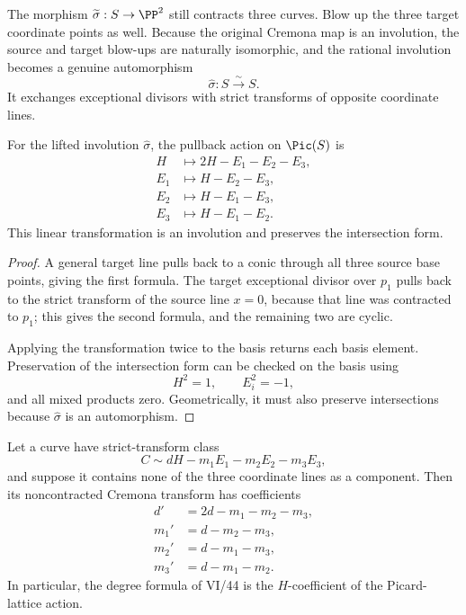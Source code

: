 The morphism \(\widetilde\sigma:S\to\PP^2\) still contracts three curves.  Blow up the three target coordinate points as well.  Because the original Cremona map is an involution, the source and target blow-ups are naturally isomorphic, and the rational involution becomes a genuine automorphism
\[
  \widehat\sigma:S\xrightarrow{\sim}S.
\]
It exchanges exceptional divisors with strict transforms of opposite coordinate lines.

\begin{theorem}\label{thm:vi45-cremona-picard-action}
For the lifted involution \(\widehat\sigma\), the pullback action on \(\Pic(S)\) is
\[
\begin{aligned}
  H&\longmapsto 2H-E_1-E_2-E_3,\\
  E_1&\longmapsto H-E_2-E_3,\\
  E_2&\longmapsto H-E_1-E_3,\\
  E_3&\longmapsto H-E_1-E_2.
\end{aligned}
\]
This linear transformation is an involution and preserves the intersection form.
\end{theorem}

\begin{proof}
A general target line pulls back to a conic through all three source base points, giving the first formula.  The target exceptional divisor over \(p_1\) pulls back to the strict transform of the source line \(x=0\), because that line was contracted to \(p_1\); this gives the second formula, and the remaining two are cyclic.

Applying the transformation twice to the basis returns each basis element.  Preservation of the intersection form can be checked on the basis using
\[
  H^2=1,\qquad E_i^2=-1,
\]
and all mixed products zero.  Geometrically, it must also preserve intersections because \(\widehat\sigma\) is an automorphism.
\end{proof}

\begin{proposition}\label{prop:vi45-degree-multiplicity-action}
Let a curve have strict-transform class
\[
  C\sim dH-m_1E_1-m_2E_2-m_3E_3,
\]
and suppose it contains none of the three coordinate lines as a component.  Then its noncontracted Cremona transform has coefficients
\[
\boxed{\begin{aligned}
  d'&=2d-m_1-m_2-m_3,\\
  m_1'&=d-m_2-m_3,\\
  m_2'&=d-m_1-m_3,\\
  m_3'&=d-m_1-m_2.
\end{aligned}}
\]
In particular, the degree formula of VI/44 is the \(H\)-coefficient of the Picard-lattice action.
\end{proposition}

